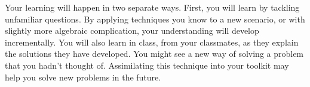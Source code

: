 \documentclass[class=exam, crop=false, 12pt]{standalone}
\begin{document}
\noindent Your learning will happen in two separate ways. First, you will learn by tackling unfamiliar questions. By applying techniques you know to a new scenario, or with slightly more algebraic complication, your understanding will develop incrementally. You will also learn in class, from your classmates, as they explain the solutions they have developed. You might see a new way of solving a problem that you hadn't thought of. Assimilating this technique into your toolkit may help you solve new problems in the future.
\end{document}
